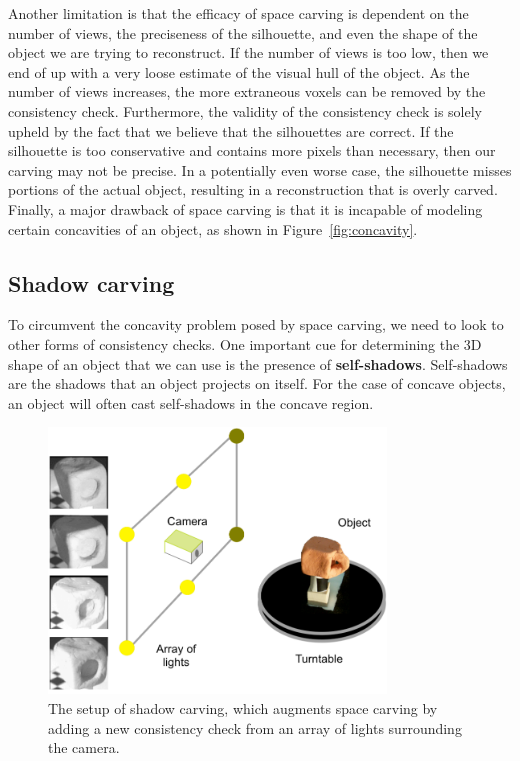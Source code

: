 \documentclass[a4paper, 12pt]{article}
\renewcommand\emph{\textbf}
\numberwithin{equation}{section}
\begin{document}
Another limitation is that the efficacy of space carving is dependent on the number of views, the preciseness of the silhouette, and even the shape of the object we are trying to reconstruct. If the number of views is too low, then we end of up with a very loose estimate of the visual hull of the object. As the number of views increases, the more extraneous voxels can be removed by the consistency check. Furthermore, the validity of the consistency check is solely upheld by the fact that we believe that the silhouettes are correct. If the silhouette is too conservative and contains more pixels than necessary, then our carving may not be precise. In a potentially even worse case, the silhouette misses portions of the actual object, resulting in a reconstruction that is overly carved. Finally, a major drawback of space carving is that it is incapable of modeling certain concavities of an object, as shown in Figure~\ref{fig:concavity}.

\subsection{Shadow carving}
To circumvent the concavity problem posed by space carving, we need to look to other forms of consistency checks. One important cue for determining the 3D shape of an object that we can use is the presence of \emph{self-shadows}. Self-shadows are the shadows that an object projects on itself. For the case of concave objects, an object will often cast self-shadows in the concave region. 

\begin{figure}[h!]
    \centering
    \includegraphics[width = 0.8\textwidth]{figures/shadow_carving.png}
    \caption{The setup of shadow carving, which augments space carving by adding a new consistency check from an array of lights surrounding the camera.}
    \label{fig:shadow_carving}
\end{figure}
\end{document}
